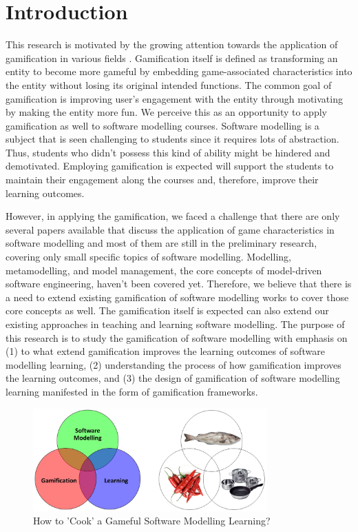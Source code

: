 \documentclass[12pt, a4paper]{report}
\begin{document}
\tableofcontents
{}

\chapter{Introduction}
This research is motivated by the growing attention towards the application of gamification in various fields \cite{kolovos2015eugenia}. Gamification itself is defined as transforming an entity to become more gameful by embedding game-associated characteristics into the entity without losing its original intended functions. The common goal of gamification is improving user’s engagement with the entity through motivating by making the entity more fun. We perceive this as an opportunity to apply gamification as well to software modelling courses. Software modelling is a subject that is seen challenging to students since it requires lots of abstraction. Thus, students who didn’t possess this kind of ability might be hindered and demotivated. Employing gamification is expected will support the students to maintain their engagement along the courses and, therefore, improve their learning outcomes. 

However, in applying the gamification, we faced a challenge that there are only several papers available that discuss the application of game characteristics in software modelling and most of them are still in the preliminary research, covering only small specific topics of software modelling. Modelling, metamodelling, and model management, the core concepts of model-driven software engineering, haven’t been covered yet.  Therefore, we believe that there is a need to extend existing gamification of software modelling works to cover those core concepts as well. The gamification itself is expected can also extend our existing approaches in teaching and learning software modelling. The purpose of this research is to study the gamification of software modelling with emphasis on (1) to what extend gamification improves the learning outcomes of software modelling learning, (2) understanding the process of how gamification improves the learning outcomes, and (3) the design of gamification of software modelling learning manifested in the form of gamification frameworks.

\begin{figure}[ht]
\centering
\includegraphics[width=9cm]{smlg}
\caption{How to 'Cook' a Gameful Software Modelling Learning?}
\label{fig:smlg}
\end{figure}
\end{document}
